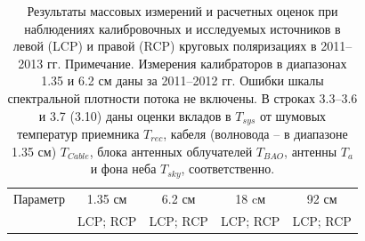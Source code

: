 \begin{table}
\caption{Результаты массовых измерений и расчетных оценок при наблюдениях калибровочных и
исследуемых источников в левой (LCP) и правой (RCP) круговых поляризациях в 2011--2013 гг.
\tiny{Примечание. Измерения калибраторов в диапазонах 1.35 и 6.2 см даны за 2011–2012 гг. Ошибки
шкалы спектральной плотности потока не включены. В строках 3.3–3.6 и 3.7 (3.10) даны оценки вкладов
в $T_{sys}$ от шумовых температур приемника $T_{rec}$, кабеля (волновода – в диапазоне 1.35 см)
$T_{Cable}$, блока антенных облучателей $T_{BAO}$, антенны $T_a$ и фона неба $T_{sky}$,
соответственно.
}}
\bigskip
\label{tab:srt_params2}
\centering
    \begin{SingleSpace}
    \tiny
        \begin{tabular}{lcccc}
        \toprule
Параметр              & 1.35 см  & 6.2 см   & 18 cм    & 92 см\\
                      & LCP; RCP & LCP; RCP & LCP; RCP & LCP; RCP\\


\end{tabular}
\end{SingleSpace}
\end{table}
